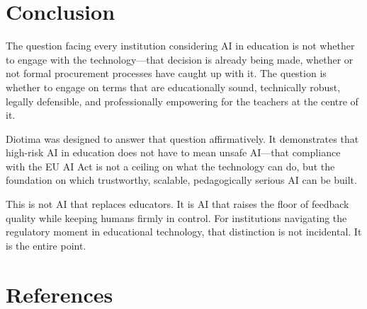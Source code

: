 \documentclass[10pt, a4paper, twocolumn]{article}
\begin{document}
\section{Conclusion}

The question facing every institution considering AI in education is not whether to
engage with the technology---that decision is already being made, whether or not formal
procurement processes have caught up with it. The question is whether to engage on
terms that are educationally sound, technically robust, legally defensible, and
professionally empowering for the teachers at the centre of it.

Diotima was designed to answer that question affirmatively. It demonstrates that
high-risk AI in education does not have to mean unsafe AI---that compliance with the
EU AI Act is not a ceiling on what the technology can do, but the foundation on which
trustworthy, scalable, pedagogically serious AI can be built.

This is not AI that replaces educators. It is AI that raises the floor of feedback
quality while keeping humans firmly in control. For institutions navigating the
regulatory moment in educational technology, that distinction is not incidental. It is
the entire point.

\section*{References}
\end{document}

